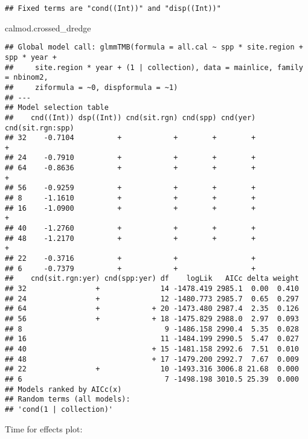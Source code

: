 \documentclass[]{article}
\newenvironment{Shaded}{\begin{snugshade}}{\end{snugshade}}
\newcommand{\NormalTok}[1]{#1}
\begin{document}
\begin{verbatim}
## Fixed terms are "cond((Int))" and "disp((Int))"
\end{verbatim}

\begin{Shaded}
\begin{Highlighting}[]
\NormalTok{calmod.crossed_dredge}
\end{Highlighting}
\end{Shaded}

\begin{verbatim}
## Global model call: glmmTMB(formula = all.cal ~ spp * site.region + spp * year + 
##     site.region * year + (1 | collection), data = mainlice, family = nbinom2, 
##     ziformula = ~0, dispformula = ~1)
## ---
## Model selection table 
##    cnd((Int)) dsp((Int)) cnd(sit.rgn) cnd(spp) cnd(yer) cnd(sit.rgn:spp)
## 32    -0.7104          +            +        +        +                +
## 24    -0.7910          +            +        +        +                 
## 64    -0.8636          +            +        +        +                +
## 56    -0.9259          +            +        +        +                 
## 8     -1.1610          +            +        +        +                 
## 16    -1.0900          +            +        +        +                +
## 40    -1.2760          +            +        +        +                 
## 48    -1.2170          +            +        +        +                +
## 22    -0.3716          +            +                 +                 
## 6     -0.7379          +            +                 +                 
##    cnd(sit.rgn:yer) cnd(spp:yer) df    logLik   AICc delta weight
## 32                +              14 -1478.419 2985.1  0.00  0.410
## 24                +              12 -1480.773 2985.7  0.65  0.297
## 64                +            + 20 -1473.480 2987.4  2.35  0.126
## 56                +            + 18 -1475.829 2988.0  2.97  0.093
## 8                                 9 -1486.158 2990.4  5.35  0.028
## 16                               11 -1484.199 2990.5  5.47  0.027
## 40                             + 15 -1481.158 2992.6  7.51  0.010
## 48                             + 17 -1479.200 2992.7  7.67  0.009
## 22                +              10 -1493.316 3006.8 21.68  0.000
## 6                                 7 -1498.198 3010.5 25.39  0.000
## Models ranked by AICc(x) 
## Random terms (all models): 
## 'cond(1 | collection)'
\end{verbatim}

Time for effects plot:
\end{document}
